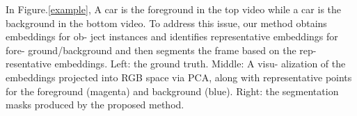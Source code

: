 In Figure.\ref{example}, A car is the foreground
in the top video while a car is the background in the bottom video.
To address this issue, our method obtains embeddings for ob-
ject instances and identifies representative embeddings for fore-
ground/background and then segments the frame based on the rep-
resentative embeddings. Left: the ground truth. Middle: A visu-
alization of the embeddings projected into RGB space via PCA,
along with representative points for the foreground (magenta) and
background (blue). Right: the segmentation masks produced by
the proposed method.

